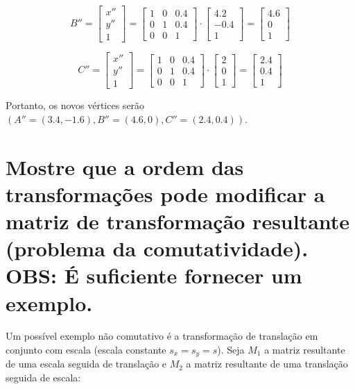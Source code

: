 \documentclass{article}
\begin{document}
$$B'' = \begin{bmatrix}
	x''\\
	y''\\
	1
\end{bmatrix} = \begin{bmatrix}
	1 & 0 & 0.4\\
	0 & 1 & 0.4\\
	0 & 0 & 1
\end{bmatrix} \cdot \begin{bmatrix}
	4.2\\
	-0.4\\
	1
\end{bmatrix} = \begin{bmatrix}
	4.6\\
	0\\
	1
\end{bmatrix}$$

$$C'' = \begin{bmatrix}
	x''\\
	y''\\
	1
\end{bmatrix} = \begin{bmatrix}
	1 & 0 & 0.4\\
	0 & 1 & 0.4\\
	0 & 0 & 1
\end{bmatrix} \cdot \begin{bmatrix}
	2\\
	0\\
	1
\end{bmatrix} = \begin{bmatrix}
	2.4\\
	0.4\\
	1
\end{bmatrix}$$

Portanto, os novos vértices serão $(A''=(3.4, -1.6), B''=(4.6, 0), C''=(2.4, 0.4))$.

\section{Mostre que a ordem das transformações pode modificar a matriz de transformação resultante (problema da comutatividade). OBS: É suficiente fornecer um exemplo.}

Um possível exemplo não comutativo é a transformação de translação em conjunto com escala (escala constante $s_x = s_y = s$). Seja $M_1$ a matriz resultante de uma escala seguida de translação e $M_2$ a matriz resultante de uma translação seguida de escala:
\end{document}
